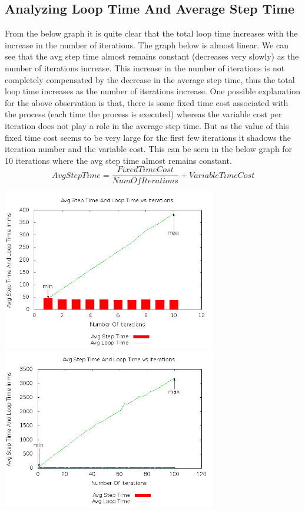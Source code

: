 \documentclass[11pt]{article}
\begin{document}
	\subsection{Analyzing Loop Time And Average Step Time }
	 From the below graph it is quite clear that the total loop time increases with the increase in the number of iterations. The graph below is almost linear. We can see that the avg step time almost remains constant (decreases very slowly) as the number of iterations increase. This increase in the number of iterations is not completely compensated by the decrease in the average step time, thus the total loop time increases as the number of iterations increase. \newline
	One possible explanation for the above observation is that, there is some fixed time cost associated with the process (each time the process is executed) whereas the variable cost per iteration does not play a role in the average step time. But as the value of this fixed time cost seems to be very large for the first few iterations it shadows the iteration number and the variable cost. This can be seen in the below graph for 10 iterations where the avg step time almost remains constant.\newline
\begin{equation*} AvgStepTime = \frac{FixedTimeCost}{NumOfIterations} + VariableTimeCost \end{equation*} \newline

		\begin{center}\includegraphics[height=7cm]{10_10_plot01.png}\includegraphics[height=7cm]{100_30_plot01.png}\end{center}
\end{document}
